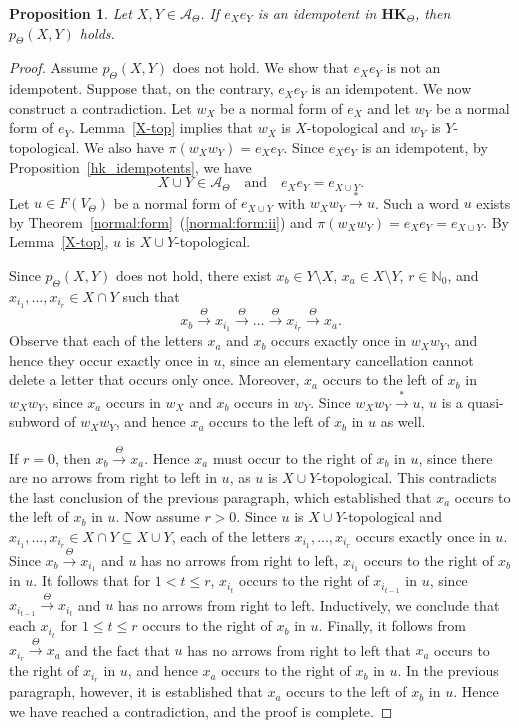 \documentclass[pdflatex,sn-mathphys-num]{sn-jnl}
\newcommand{\hk}{\mathbf{HK}_{\Theta}}
\newcommand{\tot}{\overset{\Theta}{\to}}
\newtheorem{proposition}[theorem]{Proposition}
\theoremstyle{definition}
\theoremstyle{remark}
\begin{document}
\begin{proposition}\label{prop1}
   Let $X, Y \in \mathcal{A}_{\Theta}$.
   If $e_X e_Y$ is an idempotent in $\hk$, then $p_{\Theta}(X, Y)$ holds.
\end{proposition}

\begin{proof}
   Assume $p_{\Theta}(X, Y)$ does not hold.
   We show that $e_X e_Y$ is not an idempotent.
   Suppose that, on the contrary, $e_X e_Y$ is an idempotent.
   We now construct a contradiction.
   Let $w_X$ be a normal form of $e_X$ and let $w_Y$ be a normal form of $e_Y$.
   Lemma~\ref{X-top} implies that $w_X$ is $X$-topological and $w_Y$ is $Y$-topological.
   We also have $\pi(w_X w_Y) = e_X e_Y$.
   Since $e_X e_Y$ is an idempotent, by Proposition~\ref{hk_idempotents}, we have 
   \[
   X \cup Y \in \mathcal{A}_{\Theta} \quad \text{and} \quad e_X e_Y = e_{X \cup Y}.
   \]
   Let $u \in F(V_{\Theta})$ be a normal form of $e_{X \cup Y}$ with $w_X w_Y \overset{*}{\to} u$.
   Such a word $u$ exists by Theorem~\ref{normal:form}~(\ref{normal:form:ii}) and $\pi(w_X w_Y) = e_X e_Y = e_{X \cup Y}$.
   By Lemma~\ref{X-top}, $u$ is $X \cup Y$-topological.

   Since $p_{\Theta}(X, Y)$ does not hold, there exist $x_b \in Y \setminus X$, $x_a \in X \setminus Y$, $r \in \mathbb{N}_0$, and $x_{i_1}, \dots, x_{i_r} \in X \cap Y$ such that 
   \[
   x_b \tot x_{i_1} \tot \dots \tot x_{i_r} \tot x_a.
   \]
   Observe that each of the letters $x_a$ and $x_b$ occurs exactly once in $w_X w_Y$, and hence they occur exactly once in $u$, since an elementary cancellation cannot delete a letter that occurs only once.
   Moreover, $x_a$ occurs to the left of $x_b$ in $w_X w_Y$, since $x_a$ occurs in $w_X$ and $x_b$ occurs in $w_Y$.
   Since $w_X w_Y \overset{*}{\to} u$, $u$ is a quasi-subword of $w_X w_Y$, and hence $x_a$ occurs to the left of $x_b$ in $u$ as well.
   
   If $r = 0$, then $x_b \tot x_a$.
   Hence $x_a$ must occur to the right of $x_b$ in $u$, since there are no arrows from right to left in $u$, as $u$ is $X \cup Y$-topological.
   This contradicts the last conclusion of the previous paragraph, which established that $x_a$ occurs to the left of $x_b$ in $u$.
   Now assume $r > 0$.
   Since $u$ is $X \cup Y$-topological and $x_{i_1}, \dots, x_{i_r} \in X \cap Y \subseteq X \cup Y$, each of the letters $x_{i_1}, \dots, x_{i_r}$ occurs exactly once in $u$.
   Since $x_b \tot x_{i_1}$ and $u$ has no arrows from right to left, $x_{i_1}$ occurs to the right of $x_b$ in $u$.
   It follows that for $1 < t \leq r$, $x_{i_t}$ occurs to the right of $x_{i_{t-1}}$ in $u$, since $x_{i_{t-1}} \tot x_{i_t}$ and $u$ has no arrows from right to left.
   Inductively, we conclude that each $x_{i_t}$ for $1 \leq t \leq r$ occurs to the right of $x_b$ in $u$.
   Finally, it follows from $x_{i_r} \tot x_a$ and the fact that $u$ has no arrows from right to left that $x_a$ occurs to the right of $x_{i_r}$ in $u$, and hence $x_a$ occurs to the right of $x_b$ in $u$.
   In the previous paragraph, however, it is established that $x_a$ occurs to the left of $x_b$ in $u$.
   Hence we have reached a contradiction, and the proof is complete.
\end{proof}
\end{document}

